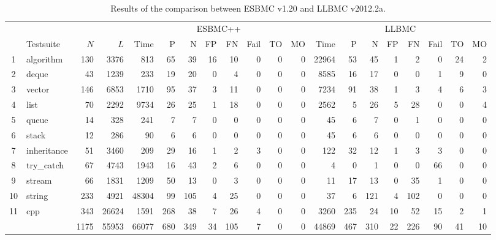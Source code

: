 \documentclass[conference]{IEEEtran}
\begin{document}
\begin{table}[t!]
\begin{adjustwidth}{-0.5cm}{}
\renewcommand\arraystretch{1.18}
\setlength{\tabcolsep}{4pt}
\begin{center} {\small
\begin{tabular}{|c|l|r|r||r|r|r|r|r|r|r|r|r|r|r|r|r|r|r|r|}
\hline
  & & & & \multicolumn{8}{c|}{ESBMC++}
        & \multicolumn{8}{c|}{LLBMC} \\  \cline{5-20}
  & Testsuite   & $N$  & $L$   & Time  & P    & N   & FP  & FN   & Fail & TO   & MO    & Time   & P   & N   & FP  & FN  & Fail & TO  & MO \\\hline
1 & algorithm   & 130  & 3376  & 813   & 65   & 39  & 16  & 10   & 0  & 0  & 0     & 22964  & 53  & 45  & 1   & 2   & 0    & 24  & 2\\ %
\hline
2 & deque       & 43   & 1239  & 233   & 19   & 20  & 0   & 4    & 0  & 0  & 0     & 8585   & 16  & 17  & 0   & 0   & 1    & 9   & 0\\ %
\hline
3 & vector      & 146  & 6853  & 1710  & 95   & 37  & 3   & 11   & 0  & 0  & 0     & 7234   & 91  & 38  & 1   & 3   & 4    & 6   & 3\\ %
\hline
4 & list        & 70   & 2292  & 9734  & 26   & 25  & 1   & 18   & 0  & 0  & 0     & 2562   & 5   & 26  & 5   & 28  & 0    & 0   & 4\\ %
\hline
5 & queue       & 14   & 328   & 241   & 7    & 7   & 0   & 0    & 0  & 0  & 0     & 45     & 6   & 7   & 0   & 1   & 0    & 0   & 0\\ %
\hline
6 & stack       & 12   & 286   & 90    & 6    & 6   & 0   & 0    & 0  & 0  & 0     & 45     & 6   & 6   & 0   & 0   & 0    & 0   & 0\\ %
\hline
7 & inheritance & 51   & 3460  & 209   & 29   & 16  & 1   & 2    & 3  & 0  & 0     & 122    & 32  & 12  & 1   & 3   & 3    & 0   & 0\\ %
\hline
8 & try\_catch  & 67   & 4743  & 1943  & 16   & 43  & 2   & 6    & 0  & 0  & 0     & 4      & 0   & 1   & 0   & 0   & 66   & 0   & 0 \\ %
\hline
9 & stream      & 66   & 1831  & 1209  & 50   & 13  & 0   & 3    & 0  & 0  & 0     & 11     & 17  & 13  & 0   & 35  & 1    & 0   & 0\\ %
\hline
10 & string     & 233  & 4921  & 48304 & 99   & 105 & 4   & 25   & 0  & 0  & 0     & 37     & 6   & 121 & 4   & 102 & 0    & 0   & 0\\ %
\hline
11 & cpp        & 343  & 26624 & 1591  & 268  & 38  & 7   & 26   & 4  & 0  & 0     & 3260   & 235 & 24  & 10  & 52  & 15   & 2   & 1\\ %
\hline\hline
  &             & 1175 & 55953 & 66077 & 680  & 349 & 34  & 105  & 7  & 0  & 0     & 44869  & 467 & 310 & 22  & 226 & 90   & 41  & 10\\ %
\hline
\end{tabular} }
\end{center}
\caption{Results of the comparison between ESBMC v1.20 and LLBMC v2012.2a.}
\label{table:results-of-the-comparison-between-ESBMC-and-LLBMC}
\end{adjustwidth}
\end{table}
\end{document}
